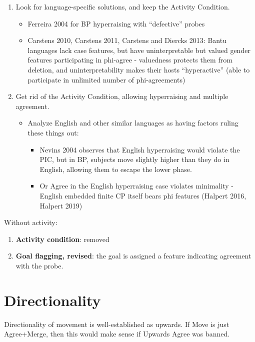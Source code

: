 \begin{enumerate}
  \item Look for language-specific solutions, and keep the Activity Condition.
  \begin{itemize}
    \item Ferreira 2004 for BP hyperraising with ``defective'' probes
    \item Carstens 2010, Carstens 2011, Carstens and Diercks 2013: Bantu languages lack case features, but have uninterpretable but valued gender features participating in phi-agree - valuedness protects them from deletion, and uninterpretability makes their hosts ``hyperactive'' (able to participate in unlimited number of phi-agreements)
  \end{itemize}
  \item Get rid of the Activity Condition, allowing hyperraising and multiple agreement.
  \begin{itemize}
    \item Analyze English and other similar languages as having factors ruling these things out:
    \begin{itemize}
      \item Nevins 2004 observes that English hyperraising would violate the PIC, but in BP, subjects move slightly higher than they do in English, allowing them to escape the lower phase.
      \item Or Agree in the English hyperraising case violates minimality - English embedded finite CP itself bears phi features (Halpert 2016, Halpert 2019)
    \end{itemize}
  \end{itemize}
\end{enumerate}

Without activity:

\begin{enumerate}
  \item \textbf{Activity condition}: removed
  \item \textbf{Goal flagging, revised}: the goal is assigned a feature indicating agreement with the probe.
\end{enumerate}

\section*{Directionality}

Directionality of movement is well-established as upwards. If Move is just Agree+Merge, then this would make sense if Upwards Agree was banned.

